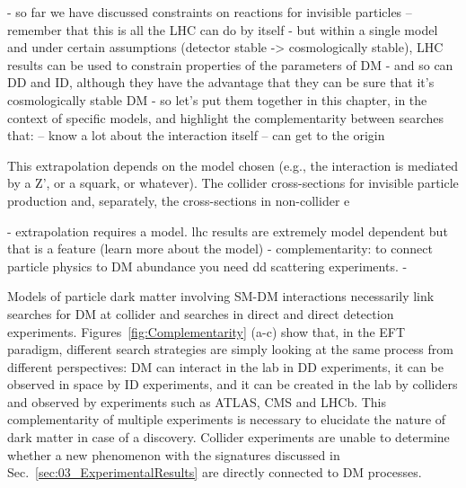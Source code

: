 

- so far we have discussed constraints on reactions for invisible particles
-- remember that this is all the LHC can do by itself
- but within a single model and under certain assumptions (detector stable -> cosmologically stable), LHC results can be used to constrain properties of the parameters of DM
- and so can DD and ID, although they have the advantage that they can be sure that it's cosmologically stable DM 
- so let's put them together in this chapter, in the context of specific models, and highlight the complementarity between searches that:
-- know a lot about the interaction itself
-- can get to the origin



This extrapolation depends on the model chosen (e.g., the interaction is mediated by a Z’, or a squark, or whatever).
The collider cross-sections for invisible particle production and, separately, the cross-sections in non-collider e 

- extrapolation requires a model. lhc results are extremely model dependent but that is a feature (learn more about the model)
- complementarity: to connect particle physics to DM abundance you need dd scattering experiments.
- 


Models of particle dark matter involving SM-DM interactions necessarily link searches for DM at collider and searches in direct and direct detection experiments. Figures~\ref{fig:Complementarity} (a-c) show that, in the EFT paradigm, different search strategies are simply looking at the same process from different perspectives: DM can interact in the lab in DD experiments, it can be observed in space %
by ID experiments, and it can be created in the lab by colliders and observed by experiments such as ATLAS, CMS and LHCb. This complementarity of multiple experiments is necessary to elucidate the nature of dark matter in case of a discovery. Collider experiments are unable to determine whether a new phenomenon with the signatures discussed in Sec.~\ref{sec:03_ExperimentalResults} are directly connected to DM processes. %

